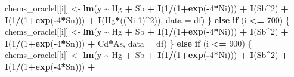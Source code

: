 \documentclass[12pt, twoside]{amherstthesis}
\newenvironment{Shaded}{\begin{snugshade}}{\end{snugshade}}
\newcommand{\AttributeTok}[1]{\textcolor[rgb]{0.13,0.29,0.53}{#1}}
\newcommand{\ControlFlowTok}[1]{\textcolor[rgb]{0.13,0.29,0.53}{\textbf{#1}}}
\newcommand{\DecValTok}[1]{\textcolor[rgb]{0.00,0.00,0.81}{#1}}
\newcommand{\FunctionTok}[1]{\textcolor[rgb]{0.13,0.29,0.53}{\textbf{#1}}}
\newcommand{\NormalTok}[1]{#1}
\newcommand{\OtherTok}[1]{\textcolor[rgb]{0.56,0.35,0.01}{#1}}
\newcommand{\SpecialCharTok}[1]{\textcolor[rgb]{0.81,0.36,0.00}{\textbf{#1}}}
\begin{document}
\begin{Shaded}
\begin{Highlighting}[]
\NormalTok{      chems\_oraclel[[i]] }\OtherTok{\textless{}{-}} \FunctionTok{lm}\NormalTok{(y }\SpecialCharTok{\textasciitilde{}}\NormalTok{ Hg }\SpecialCharTok{+}\NormalTok{ Sb }\SpecialCharTok{+}
                                \FunctionTok{I}\NormalTok{(}\DecValTok{1}\SpecialCharTok{/}\NormalTok{(}\DecValTok{1}\SpecialCharTok{+}\FunctionTok{exp}\NormalTok{(}\SpecialCharTok{{-}}\DecValTok{4}\SpecialCharTok{*}\NormalTok{Ni))) }\SpecialCharTok{+} \FunctionTok{I}\NormalTok{(Sb}\SpecialCharTok{\^{}}\DecValTok{2}\NormalTok{) }\SpecialCharTok{+} \FunctionTok{I}\NormalTok{(}\DecValTok{1}\SpecialCharTok{/}\NormalTok{(}\DecValTok{1}\SpecialCharTok{+}\FunctionTok{exp}\NormalTok{(}\SpecialCharTok{{-}}\DecValTok{4}\SpecialCharTok{*}\NormalTok{Sn))) }\SpecialCharTok{+}
                                \FunctionTok{I}\NormalTok{(Hg}\SpecialCharTok{*}\NormalTok{((Ni}\DecValTok{{-}1}\NormalTok{)}\SpecialCharTok{\^{}}\DecValTok{2}\NormalTok{)), }\AttributeTok{data =}\NormalTok{ df)}
\NormalTok{    \} }\ControlFlowTok{else} \ControlFlowTok{if}\NormalTok{ (i }\SpecialCharTok{\textless{}=} \DecValTok{700}\NormalTok{) \{}
\NormalTok{      chems\_oraclel[[i]] }\OtherTok{\textless{}{-}} \FunctionTok{lm}\NormalTok{(y }\SpecialCharTok{\textasciitilde{}}\NormalTok{ Hg }\SpecialCharTok{+}\NormalTok{ Sb }\SpecialCharTok{+}
                                \FunctionTok{I}\NormalTok{(}\DecValTok{1}\SpecialCharTok{/}\NormalTok{(}\DecValTok{1}\SpecialCharTok{+}\FunctionTok{exp}\NormalTok{(}\SpecialCharTok{{-}}\DecValTok{4}\SpecialCharTok{*}\NormalTok{Ni))) }\SpecialCharTok{+} \FunctionTok{I}\NormalTok{(Sb}\SpecialCharTok{\^{}}\DecValTok{2}\NormalTok{) }\SpecialCharTok{+} \FunctionTok{I}\NormalTok{(}\DecValTok{1}\SpecialCharTok{/}\NormalTok{(}\DecValTok{1}\SpecialCharTok{+}\FunctionTok{exp}\NormalTok{(}\SpecialCharTok{{-}}\DecValTok{4}\SpecialCharTok{*}\NormalTok{Sn))) }\SpecialCharTok{+}
\NormalTok{                                Cd}\SpecialCharTok{*}\NormalTok{As, }\AttributeTok{data =}\NormalTok{ df)}
\NormalTok{    \} }\ControlFlowTok{else} \ControlFlowTok{if}\NormalTok{ (i }\SpecialCharTok{\textless{}=} \DecValTok{900}\NormalTok{) \{}
\NormalTok{      chems\_oraclel[[i]] }\OtherTok{\textless{}{-}} \FunctionTok{lm}\NormalTok{(y }\SpecialCharTok{\textasciitilde{}}\NormalTok{ Hg }\SpecialCharTok{+}\NormalTok{ Sb }\SpecialCharTok{+}
                                \FunctionTok{I}\NormalTok{(}\DecValTok{1}\SpecialCharTok{/}\NormalTok{(}\DecValTok{1}\SpecialCharTok{+}\FunctionTok{exp}\NormalTok{(}\SpecialCharTok{{-}}\DecValTok{4}\SpecialCharTok{*}\NormalTok{Ni))) }\SpecialCharTok{+} \FunctionTok{I}\NormalTok{(Sb}\SpecialCharTok{\^{}}\DecValTok{2}\NormalTok{) }\SpecialCharTok{+} \FunctionTok{I}\NormalTok{(}\DecValTok{1}\SpecialCharTok{/}\NormalTok{(}\DecValTok{1}\SpecialCharTok{+}\FunctionTok{exp}\NormalTok{(}\SpecialCharTok{{-}}\DecValTok{4}\SpecialCharTok{*}\NormalTok{Sn))) }\SpecialCharTok{+}

\end{Highlighting}
\end{Shaded}
\end{document}
